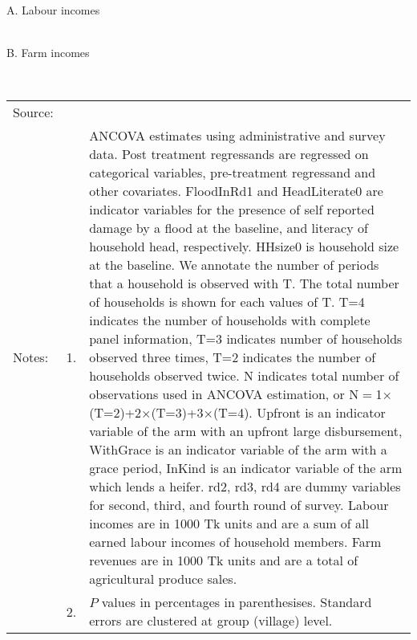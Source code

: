 \begin{minipage}[t]{14cm}
\vspace{2ex}
A. Labour incomes\\
\hfil{}\\
B. Farm incomes\\
\hfil{}\\
\renewcommand{\arraystretch}{.8}
\setlength{\tabcolsep}{1pt}
\begin{tabular}{>{\hfill\scriptsize}p{1cm}<{}>{\hfill\scriptsize}p{.25cm}<{}>{\scriptsize}p{12cm}<{\hfill}}
Source:& \multicolumn{2}{l}{\scriptsize Estimated with GUK administrative and survey data.}\\
Notes: & 1. & ANCOVA estimates using administrative and survey data. Post treatment regressands are regressed on categorical variables, pre-treatment regressand and other covariates. \textsf{FloodInRd1} and \textsf{HeadLiterate0} are indicator variables for the presence of self reported damage by a flood at the baseline, and literacy of household head, respectively. \textsf{HHsize0} is household size at the baseline. We annotate the number of periods that a household is observed with \textsf{T}. The total number of households is shown for each values of \textsf{T}. \textsf{T=4} indicates the number of households with complete panel information, \textsf{T=3} indicates number of households observed three times, \textsf{T=2} indicates the number of households observed twice. \textsf{N} indicates total number of observations used in ANCOVA estimation, or \textsf{N$=$1$\times$(T=2)+2$\times$(T=3)+3$\times$(T=4)}.  \textsf{Upfront} is an indicator variable of the arm with an upfront large disbursement, \textsf{WithGrace} is an indicator variable of the arm with a grace period, \textsf{InKind} is an indicator variable of the arm which lends a heifer. \textsf{rd2, rd3, rd4} are dummy variables for second, third, and fourth round of survey. Labour incomes are in 1000 Tk units and are a sum of all earned labour incomes of household members. Farm revenues are in 1000 Tk units and are a total of agricultural produce sales. \\
& 2. & $P$ values in percentages in parenthesises. Standard errors are clustered at group (village) level.
\end{tabular}
\end{minipage}

